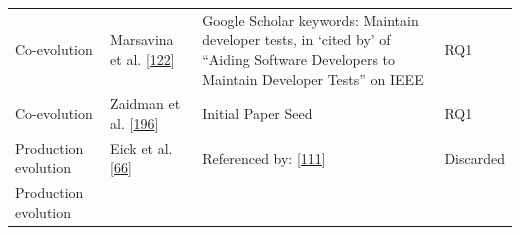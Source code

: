 \documentclass[]{book}
\begin{document}
\begin{longtable}[]{@{}llll@{}}
\begin{minipage}[t]{0.18\columnwidth}
Co-evolution\strut
\end{minipage} & \begin{minipage}[t]{0.16\columnwidth}\raggedright\strut
Marsavina et al. {[}\protect\hyperlink{ref-marsavina2014}{122}{]}\strut
\end{minipage} & \begin{minipage}[t]{0.50\columnwidth}\raggedright\strut
Google Scholar keywords: Maintain developer tests, in `cited by' of
``Aiding Software Developers to Maintain Developer Tests'' on IEEE\strut
\end{minipage} & \begin{minipage}[t]{0.04\columnwidth}\raggedright\strut
RQ1\strut
\end{minipage}\tabularnewline
\begin{minipage}[t]{0.18\columnwidth}\raggedright\strut
Co-evolution\strut
\end{minipage} & \begin{minipage}[t]{0.16\columnwidth}\raggedright\strut
Zaidman et al.
{[}\protect\hyperlink{ref-zaidman2011studying}{196}{]}\strut
\end{minipage} & \begin{minipage}[t]{0.50\columnwidth}\raggedright\strut
Initial Paper Seed\strut
\end{minipage} & \begin{minipage}[t]{0.04\columnwidth}\raggedright\strut
RQ1\strut
\end{minipage}\tabularnewline
\begin{minipage}[t]{0.18\columnwidth}\raggedright\strut
Production evolution\strut
\end{minipage} & \begin{minipage}[t]{0.16\columnwidth}\raggedright\strut
Eick et al. {[}\protect\hyperlink{ref-eick2001}{66}{]}\strut
\end{minipage} & \begin{minipage}[t]{0.50\columnwidth}\raggedright\strut
Referenced by: {[}\protect\hyperlink{ref-leung2015testing}{111}{]}\strut
\end{minipage} & \begin{minipage}[t]{0.04\columnwidth}\raggedright\strut
Discarded\strut
\end{minipage}\tabularnewline
\begin{minipage}[t]{0.18\columnwidth}\raggedright\strut
Production evolution\strut
\end{minipage} & \begin{minipage}[t]{0.16\columnwidth}\raggedright\strut

\end{minipage}
\end{longtable}
\end{document}
